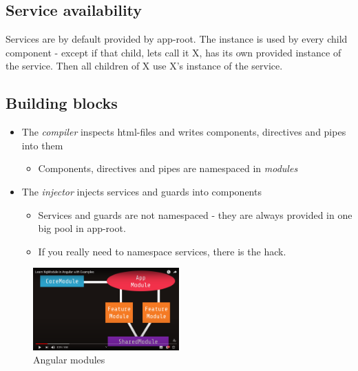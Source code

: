 \subsection{Service availability}
Services are by default provided by app-root. The instance is used by every child component - except if that child, lets call it X, has its own provided instance of the service. Then all children of X use X's instance of the service.


\subsection{Building blocks}
\begin{itemize}
    \item The \emph{compiler} inspects html-files and writes components, directives and pipes into them
    \begin{itemize}
        \item Components, directives and pipes are namespaced in \emph{modules}
    \end{itemize}
    \item The \emph{injector} injects services and guards into components
    \begin{itemize}
        \item Services and guards are not namespaced - they are always provided in one big pool in app-root.
        \item If you really need to namespace services, there is the  hack.
    \end{itemize}
\end{itemize}


\begin{figure}
    \caption{Angular modules}
    \centering
    \includegraphics[width=0.5\textwidth]{images/angular_modules.png}
\end{figure}


